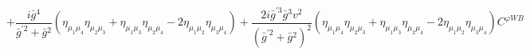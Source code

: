 %
\begin{dmath*}
%
  +  \frac{i {\bar g}{}^4}{{\bar g}^{\prime 2} + {\bar g}{}^2} \left(\eta_{\mu_1 \mu_4} \eta_{\mu_2 \mu_3} + \eta_{\mu_1 \mu_3} \eta_{\mu_2 \mu_4} - 2 \eta_{\mu_1 \mu_2} \eta_{\mu_3 \mu_4}\right)  +  \frac{2 i {\bar g}^{\prime 3} {\bar g}{}^3 v^2}{\left({\bar g}^{\prime 2} + {\bar g}{}^2\right)^2}\left(\eta_{\mu_1 \mu_4} \eta_{\mu_2 \mu_3} + \eta_{\mu_1 \mu_3} \eta_{\mu_2 \mu_4} - 2 \eta_{\mu_1 \mu_2} \eta_{\mu_3 \mu_4}\right) C^{ \varphi  WB}
%
\end{dmath*}
%

